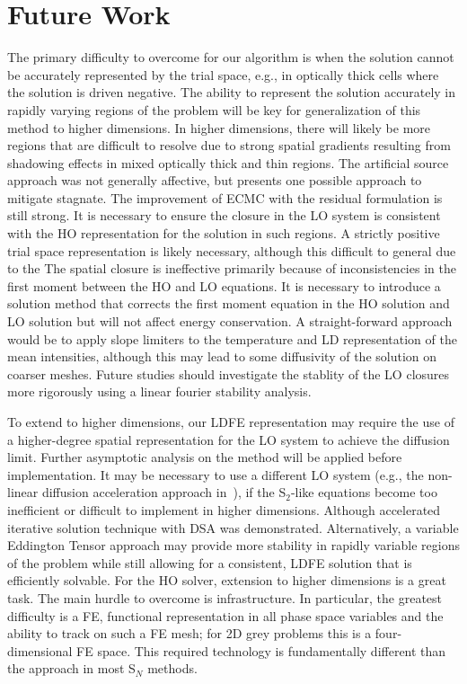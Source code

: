 \section{Future Work} 

The primary difficulty to overcome for our algorithm is when the solution cannot be
accurately represented by the trial space, e.g., in optically thick cells where the
solution is driven negative. The ability to represent the solution accurately in
rapidly varying regions of the problem will be key for generalization of this method to
higher dimensions.  In higher dimensions, there will likely be more regions
that are difficult to resolve due to strong spatial gradients resulting from shadowing
effects in mixed optically thick and thin regions.   The artificial source approach was
not generally affective, but presents one possible approach to mitigate stagnate.  The
improvement of ECMC with the residual formulation is still strong.  It is
necessary to ensure the closure in the LO system is consistent with the HO representation
for the solution in such regions. A strictly positive trial space representation is likely
necessary, although this difficult to general due to the The spatial closure is ineffective primarily because of
inconsistencies in the first moment between the HO and LO equations.  It is necessary to
introduce a solution method that corrects the first moment equation in the HO solution and
LO solution but will not affect energy conservation.  A straight-forward approach would be
to apply slope limiters to the temperature and LD representation of the mean intensities,
although this may lead to some diffusivity of the solution on coarser meshes.  Future
studies should investigate the stablity of the LO closures more rigorously using a linear
fourier stability analysis. 

To extend to higher dimensions, our LDFE representation may require the use of a higher-degree
spatial representation for the LO system to achieve the diffusion
limit. Further asymptotic
analysis on the method will be applied before implementation. It may be necessary to use a different LO system (e.g., the non-linear diffusion
acceleration approach in~\cite{rmc}), if the S$_2$-like equations become too
inefficient or difficult to implement in higher dimensions. Although accelerated iterative
solution technique with DSA was demonstrated.  Alternatively, a variable Eddington Tensor approach may provide more stability in rapidly variable
regions of the problem while still allowing for a consistent, LDFE solution that is efficiently solvable.
For the HO solver, extension to higher dimensions is a great task.  The main hurdle to
overcome is infrastructure.  In particular, the greatest difficulty is a FE, functional
representation in all phase space variables and the ability to
track on such a FE mesh; for 2D grey problems this is a four-dimensional FE space.  This
required technology is fundamentally different than the approach in most S$_N$ methods.


